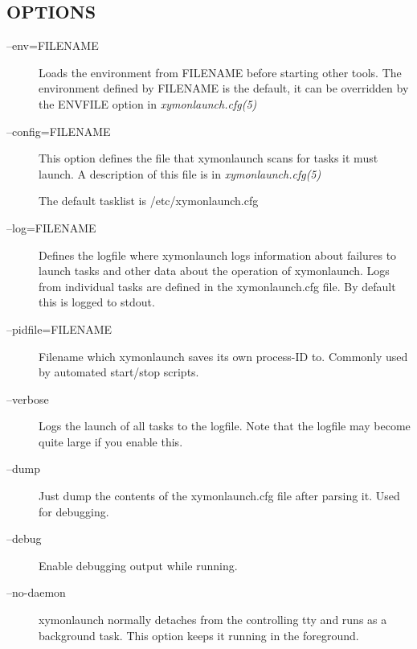 \subsection{OPTIONS}
\begin{description}
\item[--env=FILENAME] Loads the environment from FILENAME before
  starting other tools. The environment defined by FILENAME is the
  default, it can be overridden by the ENVFILE option in
  \emph{xymonlaunch.cfg(5)}



 

\item[--config=FILENAME] This option defines the file that
  xymonlaunch scans for tasks it must launch. A description of this
  file is in \emph{xymonlaunch.cfg(5)}

 The default tasklist is /etc/xymonlaunch.cfg 

 

\item[--log=FILENAME] Defines the logfile where xymonlaunch logs
  information about failures to launch tasks and other data about the
  operation of xymonlaunch. Logs from individual tasks are defined in
  the xymonlaunch.cfg file. By default this is logged to stdout. 


 

\item[--pidfile=FILENAME] Filename which xymonlaunch saves its own process-ID to. Commonly used by automated start/stop scripts. 

 

\item[--verbose] Logs the launch of all tasks to the logfile. Note that the logfile may become quite large if you enable this. 

 

\item[--dump] Just dump the contents of the xymonlaunch.cfg file after parsing it. Used for debugging. 

 

\item[--debug] Enable debugging output while running. 

 

\item[--no-daemon] xymonlaunch normally detaches from the controlling
  tty and runs as a background task. This option keeps it running in
  the foreground. 


 

\end{description}
